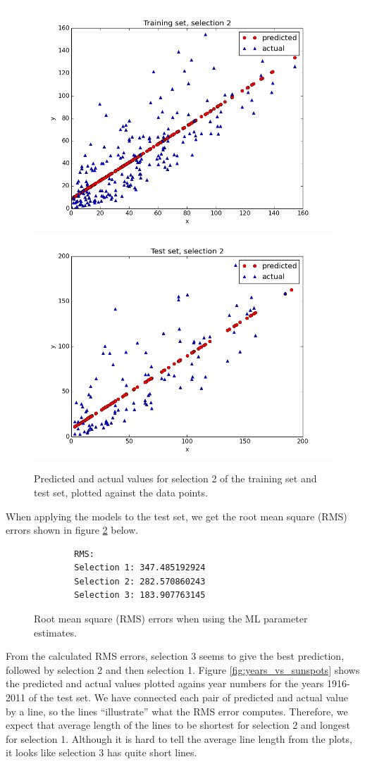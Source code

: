 \documentclass[a4paper]{article}
\begin{document}
\begin{figure}[H]
  \begin{adjustwidth}{-7em}{-7em}
    \centering
    \includegraphics[width=.47\linewidth]{figures/training_set_selection2.png}
    \includegraphics[width=.47\linewidth]{figures/test_set_selection2.png}
  \end{adjustwidth}
  \caption{Predicted and actual values for selection 2 of the training set and test set, plotted against the data points.}
  \label{fig:selection2}
\end{figure}

When applying the models to the test set, we get the root mean square (RMS) errors shown in figure \ref{fig:rms_ml} below.

\begin{figure}[H]
	\begin{lstlisting}
        RMS:
        Selection 1: 347.485192924
        Selection 2: 282.570860243
        Selection 3: 183.907763145
	\end{lstlisting}
	\caption{Root mean square (RMS) errors when using the ML parameter estimates.}
	\label{fig:rms_ml}
\end{figure}

From the calculated RMS errors, selection 3 seems to give the best prediction, followed by selection 2 and then selection 1. Figure \ref{fig:years_vs_sunspots} shows the predicted and actual values plotted agains year numbers for the years 1916-2011 of the test set. We have connected each pair of predicted and actual value by a line, so the lines ``illustrate'' what the RMS error computes. Therefore, we expect that average length of the lines to be shortest for selection 2 and longest for selection 1. Although it is hard to tell the average line length from the plots, it looks like selection 3 has quite short lines.
\end{document}
